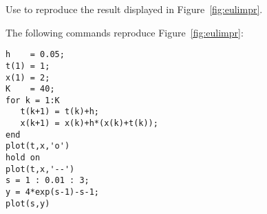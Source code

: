 \documentclass{ximera}
\begin{document}
\begin{computerExercise} \label{c15.1.6}
Use \Matlab to reproduce the result displayed in Figure~\ref{fig:eulimpr}.

\begin{solution}
The following \Matlab commands reproduce
Figure~\ref{fig:eulimpr}:
\begin{verbatim}
h    = 0.05;
t(1) = 1;
x(1) = 2;
K    = 40;
for k = 1:K
   t(k+1) = t(k)+h;
   x(k+1) = x(k)+h*(x(k)+t(k));
end
plot(t,x,'o')
hold on
plot(t,x,'--')
s = 1 : 0.01 : 3;
y = 4*exp(s-1)-s-1;
plot(s,y)
\end{verbatim}

\end{solution}
\end{computerExercise}
\end{document}
